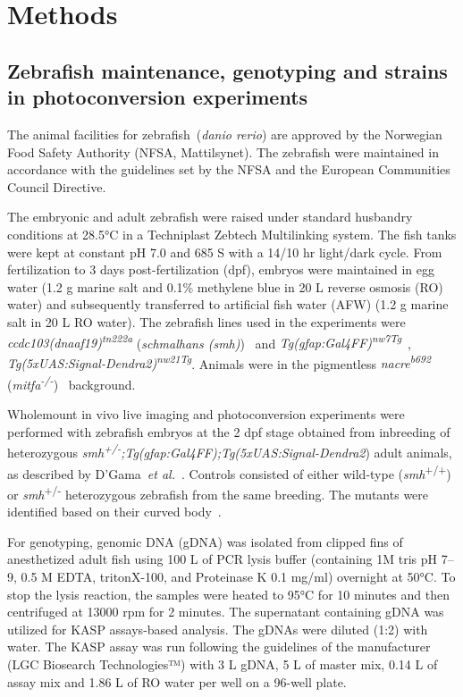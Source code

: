 \documentclass{WileyMSP-template}
\begin{document}
\section{Methods}\label{sec:methods}

\subsection{Zebrafish maintenance, genotyping and strains in photoconversion experiments}
The animal facilities for zebrafish~(\emph{danio rerio}) are approved by the
Norwegian Food Safety Authority (NFSA, Mattilsynet).
The zebrafish were maintained in accordance with the guidelines set by the
NFSA and the European Communities Council Directive.

The embryonic and adult zebrafish were raised under standard husbandry
conditions at 28.5°C in a Techniplast Zebtech Multilinking system.
The fish tanks were kept at constant pH 7.0 and 685 \textmu S with a
14/10 hr light/dark cycle.
From fertilization to 3 days post-fertilization (dpf), embryos were maintained in egg
water (1.2 g marine salt and 0.1\% methylene blue in 20 L reverse osmosis (RO) water)
and subsequently transferred to artificial fish water (AFW)
(1.2 g marine salt in 20 L RO water). The zebrafish lines used in the experiments were
\emph{ccdc103(dnaaf19)\textsuperscript{tn222a}}
(\emph{schmalhans (smh)})~\cite{Jau-NianChen1997Left-rightZebrafish}
and \emph{Tg(gfap:Gal4FF)\textsuperscript{nw7Tg}}~\cite{DiazVerdugo2019Glia-neuronSeizures},
\emph{Tg(5xUAS:Signal-Dendra2)\textsuperscript{nw21Tg}}.
Animals were in the pigmentless \emph{nacre\textsuperscript{b692}}
(\emph{mitfa\textsuperscript{-/-}})~\cite{JamesA.Lister1999NacreFate} background.

Wholemount in vivo live imaging and photoconversion
experiments were performed with zebrafish embryos at the 2 dpf stage obtained from inbreeding of heterozygous
\emph{smh\textsuperscript{+/-};Tg(gfap:Gal4FF);Tg(5xUAS:Signal-Dendra2})
adult animals, as described by D'Gama~\emph{et al.}~\cite{DGama2025MotileBrain}.
Controls consisted of either wild-type (\emph{smh}\textsuperscript{+/+})  
or \emph{smh}\textsuperscript{+/-} heterozygous zebrafish from the same breeding.
The mutants were identified based on their curved body~\cite{Jau-NianChen1997Left-rightZebrafish}.

For genotyping, genomic DNA (gDNA) was isolated from clipped fins of anesthetized adult
fish using 100 \textmu L of PCR lysis buffer (containing 1M tris pH 7--9, 0.5 M EDTA,
tritonX-100, and Proteinase K 0.1 mg/ml) overnight at 50°C.
To stop the lysis reaction, the samples were heated to 95°C for 10 minutes
and then centrifuged at 13000 rpm for 2 minutes.
The supernatant containing gDNA was utilized for KASP assays-based analysis.
The gDNAs were diluted (1:2) with water. 
The KASP assay was run following the guidelines of the
manufacturer (LGC Biosearch Technologies™) with 3 \textmu L gDNA,
5 \textmu L of master mix, 0.14 \textmu L of assay mix
and 1.86 \textmu L of RO water per well on a 96-well plate.
\end{document}
